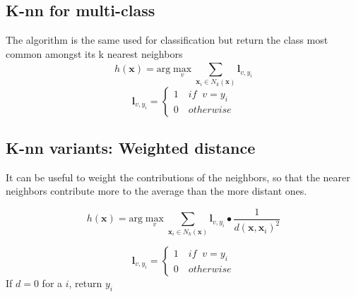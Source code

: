 \documentclass[../main.tex]{subfiles}
\begin{document}
\subsection{K-nn for multi-class}
The algorithm is the same used for classification but return the class most common amongst its k nearest neighbors
\[ 
    h(\mathbf{x}) = \mbox{arg}\max_{v} \sum_{\mathbf{x}_i \in N_k(\mathbf{x})}^{}\mathbf{l}_{v, y_i}
\]
\[
    \mathbf{l}_{v, y_i} = \left\{
                \begin{array}{ll}
                  1 \quad if \;\; v = y_i\\
                  0 \quad otherwise
                \end{array}
              \right.
\]

\subsection{K-nn variants: Weighted distance}
It can be useful to weight the contributions of the neighbors, so that the nearer neighbors contribute more to the average than the more distant ones.

\[
    h(\mathbf{x}) = \mbox{arg}\max_{v} \sum_{\mathbf{x}_i \in N_k(\mathbf{x})}^{}\mathbf{l}_{v, y_i} \bullet \frac{1}{d(\mathbf{x},\mathbf{x}_i)^2}
\]

\[
    \mathbf{l}_{v, y_i} = \left\{
                \begin{array}{ll}
                  1 \quad if \;\; v = y_i\\
                  0 \quad otherwise
                \end{array}
              \right.
\]
If $d = 0$ for a $i$, return $y_i$
\end{document}
